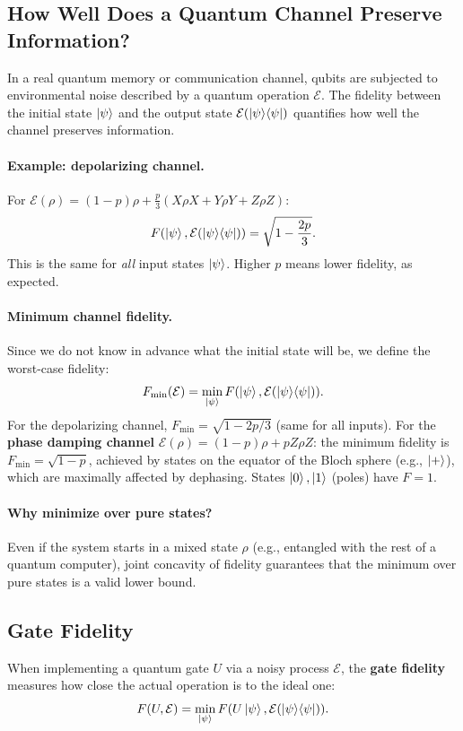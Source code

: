 \documentclass[10pt,a4paper]{article}
\begin{document}
\subsection{How Well Does a Quantum Channel Preserve Information?}

In a real quantum memory or communication channel, qubits are subjected to environmental noise described by a quantum operation $\mathcal{E}$. The fidelity between the initial state $\ket{\psi}$ and the output state $\mathcal{E}(\ket{\psi}\!\bra{\psi})$ quantifies how well the channel preserves information.

\paragraph{Example: depolarizing channel.} For $\mathcal{E}(\rho)=(1-p)\rho+\frac{p}{3}(X\rho X+Y\rho Y+Z\rho Z)$:
\[
F(\ket{\psi},\mathcal{E}(\ket{\psi}\!\bra{\psi}))=\sqrt{1-\frac{2p}{3}}.
\]
This is the same for \emph{all} input states $\ket{\psi}$. Higher $p$ means lower fidelity, as expected.

\paragraph{Minimum channel fidelity.} Since we do not know in advance what the initial state will be, we define the worst-case fidelity:
\[
F_{\min}(\mathcal{E})=\min_{\ket{\psi}}F(\ket{\psi},\mathcal{E}(\ket{\psi}\!\bra{\psi})).
\]
For the depolarizing channel, $F_{\min}=\sqrt{1-2p/3}$ (same for all inputs). For the \textbf{phase damping channel} $\mathcal{E}(\rho)=(1-p)\rho+pZ\rho Z$: the minimum fidelity is $F_{\min}=\sqrt{1-p}$, achieved by states on the equator of the Bloch sphere (e.g., $\ket{+}$), which are maximally affected by dephasing. States $\ket{0},\ket{1}$ (poles) have $F=1$.

\paragraph{Why minimize over pure states?} Even if the system starts in a mixed state $\rho$ (e.g., entangled with the rest of a quantum computer), joint concavity of fidelity guarantees that the minimum over pure states is a valid lower bound.

\subsection{Gate Fidelity}

When implementing a quantum gate $U$ via a noisy process $\mathcal{E}$, the \textbf{gate fidelity} measures how close the actual operation is to the ideal one:
\[
F(U,\mathcal{E})=\min_{\ket{\psi}}F(U\ket{\psi},\mathcal{E}(\ket{\psi}\!\bra{\psi})).
\]
\end{document}
